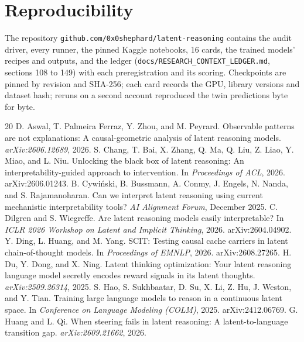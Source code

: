 \documentclass{article}
\begin{document}
\section*{Reproducibility}

The repository \texttt{github.com/0x0shephard/latent-reasoning} contains the audit driver, every runner, the pinned Kaggle notebooks, 16 cards, the trained models' recipes and outputs, and the ledger (\texttt{docs/RESEARCH\_CONTEXT\_LEDGER.md}, sections 108 to 149) with each preregistration and its scoring. Checkpoints are pinned by revision and SHA-256; each card records the GPU, library versions and dataset hash; reruns on a second account reproduced the twin predictions byte for byte.

\begin{thebibliography}{20}
\small
{} D. Aswal, T. Palmeira Ferraz, Y. Zhou, and M. Peyrard. Observable patterns are not explanations: A causal-geometric analysis of latent reasoning models. \emph{arXiv:2606.12689}, 2026.
 S. Chang, T. Bai, X. Zhang, Q. Ma, Q. Liu, Z. Liao, Y. Miao, and L. Niu. Unlocking the black box of latent reasoning: An interpretability-guided approach to intervention. In \emph{Proceedings of ACL}, 2026. arXiv:2606.01243.
 B. Cywi\'nski, B. Bussmann, A. Conmy, J. Engels, N. Nanda, and S. Rajamanoharan. Can we interpret latent reasoning using current mechanistic interpretability tools? \emph{AI Alignment Forum}, December 2025.
 C. Dilgren and S. Wiegreffe. Are latent reasoning models easily interpretable? In \emph{ICLR 2026 Workshop on Latent and Implicit Thinking}, 2026. arXiv:2604.04902.
 Y. Ding, L. Huang, and M. Yang. SCIT: Testing causal cache carriers in latent chain-of-thought models. In \emph{Proceedings of EMNLP}, 2026. arXiv:2608.27265.
 H. Du, Y. Dong, and X. Ning. Latent thinking optimization: Your latent reasoning language model secretly encodes reward signals in its latent thoughts. \emph{arXiv:2509.26314}, 2025.
 S. Hao, S. Sukhbaatar, D. Su, X. Li, Z. Hu, J. Weston, and Y. Tian. Training large language models to reason in a continuous latent space. In \emph{Conference on Language Modeling (COLM)}, 2025. arXiv:2412.06769.
 G. Huang and L. Qi. When steering fails in latent reasoning: A latent-to-language transition gap. \emph{arXiv:2609.21662}, 2026.

\end{thebibliography}
\end{document}
